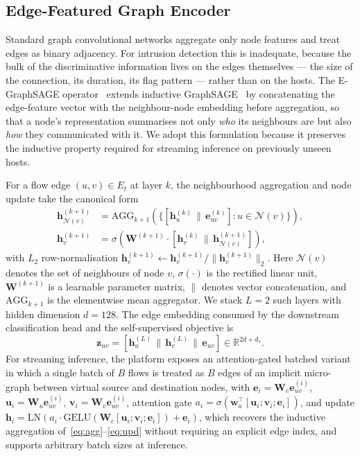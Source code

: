\documentclass[journal,twoside]{IEEEtran}
\begin{document}
\subsection{Edge-Featured Graph Encoder}
\label{sec:method:encoder}
Standard graph convolutional networks aggregate only node features and
treat edges as binary adjacency. For intrusion detection this is
inadequate, because the bulk of the discriminative information lives on
the edges themselves --- the size of the connection, its duration, its
flag pattern --- rather than on the hosts. The E-GraphSAGE
operator~\cite{lo2022egraphsage} extends inductive
GraphSAGE~\cite{hamilton2017graphsage} by concatenating the edge-feature
vector with the neighbour-node embedding before aggregation, so that a
node's representation summarises not only \emph{who} its neighbours are
but also \emph{how} they communicated with it. We adopt this formulation
because it preserves the inductive property required for streaming
inference on previously unseen hosts.

For a flow edge $(u,v) \in E_t$ at layer $k$, the neighbourhood
aggregation and node update take the canonical form
\begin{align}
\mathbf{h}_{\mathcal{N}(v)}^{(k+1)} &= \mathrm{AGG}_{k+1}\!\left(\{[\mathbf{h}_u^{(k)} \,\|\, \mathbf{e}_{uv}^{(k)}] : u \in \mathcal{N}(v)\}\right), \label{eq:agg}\\
\mathbf{h}_v^{(k+1)} &= \sigma\!\left(\mathbf{W}^{(k+1)} \cdot [\mathbf{h}_v^{(k)} \,\|\, \mathbf{h}_{\mathcal{N}(v)}^{(k+1)}]\right), \label{eq:upd}
\end{align}
with $L_2$ row-normalisation $\mathbf{h}_v^{(k+1)} \leftarrow
\mathbf{h}_v^{(k+1)}/\|\mathbf{h}_v^{(k+1)}\|_2$. Here
$\mathcal{N}(v)$ denotes the set of neighbours of node $v$,
$\sigma(\cdot)$ is the rectified linear unit, $\mathbf{W}^{(k+1)}$ is a
learnable parameter matrix, $\|$ denotes vector concatenation, and
$\mathrm{AGG}_{k+1}$ is the elementwise mean aggregator. We stack
$L = 2$ such layers with hidden dimension $d = 128$. The edge embedding
consumed by the downstream classification head and the self-supervised
objective is
\begin{equation}
\mathbf{z}_{uv} = [\mathbf{h}_u^{(L)} \,\|\, \mathbf{h}_v^{(L)} \,\|\, \mathbf{e}_{uv}] \in \mathbb{R}^{2d + d_e}.
\label{eq:zedge}
\end{equation}
For streaming inference, the platform exposes an attention-gated batched
variant in which a single batch of $B$ flows is treated as $B$ edges of an
implicit micro-graph between virtual source and destination nodes, with
$\mathbf{e}_i = \mathbf{W}_e \mathbf{e}_{uv}^{(i)}$,
$\mathbf{u}_i = \mathbf{W}_u \mathbf{e}_{uv}^{(i)}$,
$\mathbf{v}_i = \mathbf{W}_v \mathbf{e}_{uv}^{(i)}$,
attention gate $a_i = \sigma(\mathbf{w}_a^\top[\mathbf{u}_i; \mathbf{v}_i; \mathbf{e}_i])$,
and update
$\mathbf{h}_i = \mathrm{LN}(a_i \cdot \mathrm{GELU}(\mathbf{W}_c[\mathbf{u}_i; \mathbf{v}_i; \mathbf{e}_i]) + \mathbf{e}_i)$,
which recovers the inductive aggregation of~\eqref{eq:agg}--\eqref{eq:upd}
without requiring an explicit edge index, and supports arbitrary batch
sizes at inference.
\end{document}
